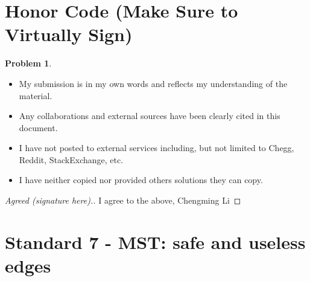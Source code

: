 \documentclass[11pt]{article}
\theoremstyle{definition}
\theoremstyle{definition}
\newtheorem{required}{Problem}
\theoremstyle{definition}
\begin{document}
\section{Honor Code (Make Sure to Virtually Sign)} \label{HonorCode}

\begin{required}
\begin{itemize}
\item My submission is in my own words and reflects my understanding of the material.
\item Any collaborations and external sources have been clearly cited in this document.
\item I have not posted to external services including, but not limited to Chegg, Reddit, StackExchange, etc.
\item I have neither copied nor provided others solutions they can copy.
\end{itemize}

\end{required}

\begin{proof}[Agreed (signature here).]
I agree to the above, Chengming Li
\end{proof}



\newpage
\section{Standard 7 - MST: safe and useless edges}
\end{document}
